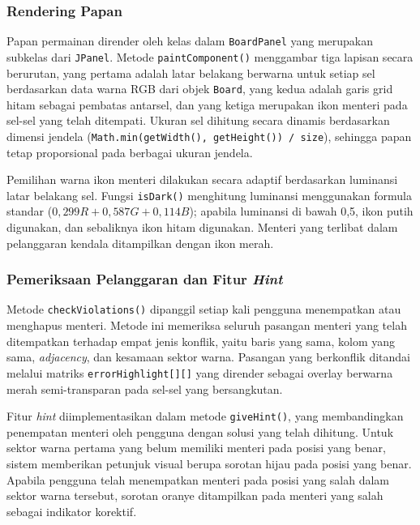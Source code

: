 \subsubsection{Rendering Papan}

Papan permainan dirender oleh kelas dalam \texttt{BoardPanel} yang merupakan subkelas dari \texttt{JPanel}. Metode \texttt{paintComponent()} menggambar tiga lapisan secara berurutan, yang pertama adalah latar belakang berwarna untuk setiap sel berdasarkan data warna RGB dari objek \texttt{Board}, yang kedua adalah garis grid hitam sebagai pembatas antarsel, dan yang ketiga merupakan ikon menteri pada sel-sel yang telah ditempati. Ukuran sel dihitung secara dinamis berdasarkan dimensi jendela (\texttt{Math.min(getWidth(), getHeight()) / size}), sehingga papan tetap proporsional pada berbagai ukuran jendela.

Pemilihan warna ikon menteri dilakukan secara adaptif berdasarkan luminansi latar belakang sel. Fungsi \texttt{isDark()} menghitung luminansi menggunakan formula standar ($0{,}299R + 0{,}587G + 0{,}114B$); apabila luminansi di bawah 0,5, ikon putih digunakan, dan sebaliknya ikon hitam digunakan. Menteri yang terlibat dalam pelanggaran kendala ditampilkan dengan ikon merah.

\subsubsection{Pemeriksaan Pelanggaran dan Fitur \textit{Hint}}

Metode \texttt{checkViolations()} dipanggil setiap kali pengguna menempatkan atau menghapus menteri. Metode ini memeriksa seluruh pasangan menteri yang telah ditempatkan terhadap empat jenis konflik, yaitu baris yang sama, kolom yang sama, \textit{adjacency}, dan kesamaan sektor warna. Pasangan yang berkonflik ditandai melalui matriks \texttt{errorHighlight[][]} yang dirender sebagai overlay berwarna merah semi-transparan pada sel-sel yang bersangkutan.

Fitur \textit{hint} diimplementasikan dalam metode \texttt{giveHint()}, yang membandingkan penempatan menteri oleh pengguna dengan solusi yang telah dihitung. Untuk sektor warna pertama yang belum memiliki menteri pada posisi yang benar, sistem memberikan petunjuk visual berupa sorotan hijau pada posisi yang benar. Apabila pengguna telah menempatkan menteri pada posisi yang salah dalam sektor warna tersebut, sorotan oranye ditampilkan pada menteri yang salah sebagai indikator korektif.

